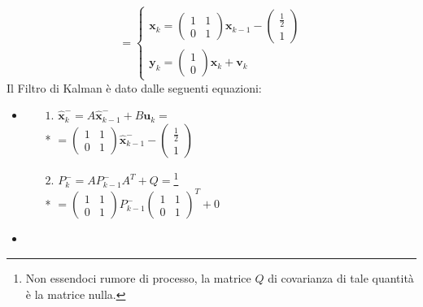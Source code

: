 $$
= \begin{cases}
\mathbf x_k = \left(\begin{matrix}
1 & 1 \\
0 & 1 
\end{matrix}\right) \mathbf x_{k-1} - \left(\begin{matrix}
\frac{1}{2} \\
1
\end{matrix}\right) \\
\mathbf y_k = \left(\begin{matrix}
1\\
0
\end{matrix}\right) \mathbf x_k + \mathbf v_k
\end{cases}
$$
Il Filtro di Kalman \`e dato dalle seguenti equazioni:
\begin{itemize}
	\item \begin{enumerate}
		\item[$1.$] $
		\hat{\mathbf{x}}^-_k = A \hat{\mathbf{x}}^-_{k-1} + B \mathbf u_k =$\\*
		$= \left(\begin{matrix}
		1 & 1 \\
		0 & 1 
		\end{matrix}\right) \hat{\mathbf{x}}^-_{k-1} - \left( \begin{matrix}
		\frac{1}{2}\\
		1
		\end{matrix}\right)
		$
		\item[$2.$]  $ P^-_k = A P^-_{k-1} A^T + Q =$\footnote{Non essendoci rumore di processo, la matrice $Q$ di covarianza di tale quantit\`a \`e la matrice nulla.}\\*
		$= \left(\begin{matrix}
		1 & 1 \\
		0 & 1 
		\end{matrix}\right) P^-_{k-1}\left(\begin{matrix}
		1 & 1 \\
		0 & 1 
		\end{matrix}\right)^T + 0$        
	\end{enumerate}
	\item
\end{itemize}

